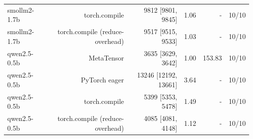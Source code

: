\begin{tabular}{lrrrrr}
smollm2-1.7b & torch.compile & 9812 [9801, 9845] & 1.06 & - & 10/10 \\
smollm2-1.7b & torch.compile (reduce-overhead) & 9517 [9515, 9533] & 1.03 & - & 10/10 \\
qwen2.5-0.5b & MetaTensor & 3635 [3629, 3642] & 1.00 & 153.83 & 10/10 \\
qwen2.5-0.5b & PyTorch eager & 13246 [12192, 13661] & 3.64 & - & 10/10 \\
qwen2.5-0.5b & torch.compile & 5399 [5353, 5478] & 1.49 & - & 10/10 \\
qwen2.5-0.5b & torch.compile (reduce-overhead) & 4085 [4081, 4148] & 1.12 & - & 10/10 \\
\bottomrule
\end{tabular}
